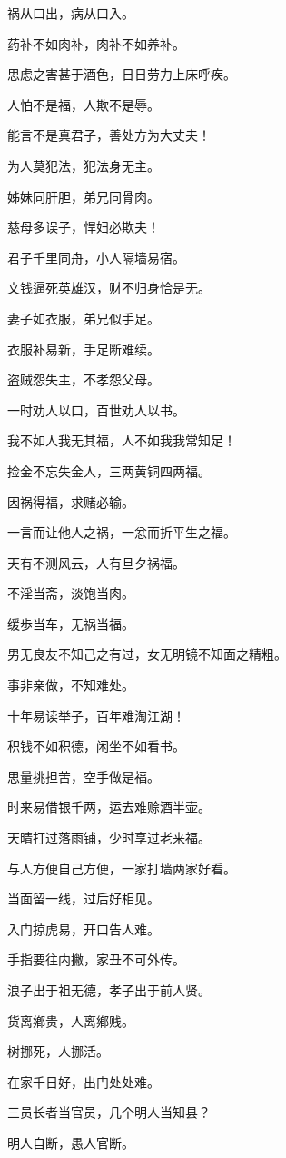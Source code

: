 \documentclass[12pt,oneside]{book}
\begin{document}
祸从口出，病从口入。

药补不如肉补，肉补不如养补。

思虑之害甚于酒色，日日劳力上床呼疾。

人怕不是福，人欺不是辱。

能言不是真君子，善处方为大丈夫！

为人莫犯法，犯法身无主。

姊妹同肝胆，弟兄同骨肉。

慈母多误子，悍妇必欺夫！

君子千里同舟，小人隔墙易宿。

文钱逼死英雄汉，财不归身恰是无。

妻子如衣服，弟兄似手足。

衣服补易新，手足断难续。

盗贼怨失主，不孝怨父母。

一时劝人以口，百世劝人以书。

我不如人我无其福，人不如我我常知足！

捡金不忘失金人，三两黄铜四两福。

因祸得福，求赌必输。

一言而让他人之祸，一忿而折平生之福。

天有不测风云，人有旦夕祸福。

不淫当斋，淡饱当肉。

缓歩当车，无祸当福。

男无良友不知己之有过，女无明镜不知面之精粗。

事非亲做，不知难处。

十年易读举子，百年难淘江湖！

积钱不如积德，闲坐不如看书。

思量挑担苦，空手做是福。

时来易借银千两，运去难赊酒半壶。

天晴打过落雨铺，少时享过老来福。

与人方便自己方便，一家打墙两家好看。

当面留一线，过后好相见。

入门掠虎易，开口告人难。

手指要往内撇，家丑不可外传。

浪子出于祖无德，孝子出于前人贤。

货离鄕贵，人离鄕贱。

树挪死，人挪活。

在家千日好，出门处处难。

三员长者当官员，几个明人当知县？

明人自断，愚人官断。
\end{document}
